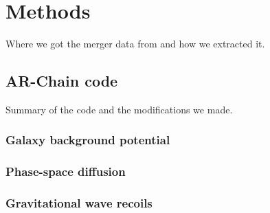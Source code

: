 \section{Methods}

Where we got the merger data from and how we extracted it.

\subsection{AR-Chain code}
Summary of the code and the modifications we made.

\subsubsection{Galaxy background potential}

\subsubsection{Phase-space diffusion}

\subsubsection{Gravitational wave recoils}



